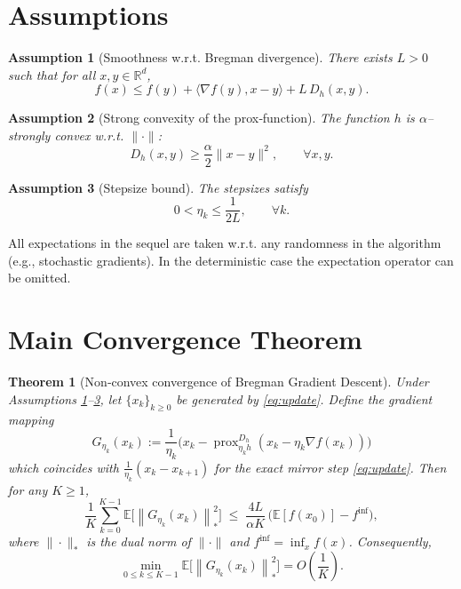 \documentclass{article}
\newtheorem{theorem}{Theorem}
\newtheorem{assumption}{Assumption}
\newcommand{\E}{\mathbb{E}}
\newcommand{\norm}[1]{\left\|#1\right\|}
\newcommand{\ip}[2]{\langle #1,#2\rangle}
\newcommand{\grad}{\nabla}
\newcommand{\D}{D_{h}}
\newcommand{\R}{\mathbb{R}}
\begin{document}
\section*{Assumptions}
\begin{assumption}[Smoothness w.r.t. Bregman divergence]\label{as:smooth}
There exists $L>0$ such that for all $x,y\in\R^{d}$,
\[
f(x)\le f(y)+\ip{\grad f(y)}{x-y}+L\,\D(x,y).
\]
\end{assumption}
\begin{assumption}[Strong convexity of the prox‑function]\label{as:hstrong}
The function $h$ is $\alpha$–strongly convex w.r.t. $\|\cdot\|$:
\[
\D(x,y)\ge \frac{\alpha}{2}\|x-y\|^{2},\qquad\forall x,y.
\]
\end{assumption}
\begin{assumption}[Stepsize bound]\label{as:stepsize}
The stepsizes satisfy 
\[
0<\eta_k\le \frac{1}{2L},\qquad\forall k .
\]
\end{assumption}
All expectations in the sequel are taken w.r.t. any randomness in the algorithm (e.g., stochastic gradients). In the deterministic case the expectation operator can be omitted.

\section*{Main Convergence Theorem}
\begin{theorem}[Non‑convex convergence of Bregman Gradient Descent]\label{thm:main}
Under Assumptions \ref{as:smooth}–\ref{as:stepsize}, let $\{x_k\}_{k\ge0}$ be generated by \eqref{eq:update}. Define the \emph{gradient mapping}
\[
G_{\eta_k}(x_k):=\frac{1}{\eta_k}\bigl(x_k-\operatorname{prox}_{\eta_k h}^{\D}(x_k-\eta_k\grad f(x_k))\bigr)
\]
which coincides with $\frac{1}{\eta_k}(x_k-x_{k+1})$ for the exact mirror step \eqref{eq:update}. Then for any $K\ge1$,
\begin{equation}
\label{eq:averaged-bound}
\frac{1}{K}\sum_{k=0}^{K-1}\E\!\bigl[\norm{G_{\eta_k}(x_k)}_{*}^{2}\bigr]
\;\le\;
\frac{4L}{\alpha K}\,\bigl(\E[f(x_0)]-f^{\inf}\bigr),
\end{equation}
where $\|\cdot\|_{*}$ is the dual norm of $\|\cdot\|$ and $f^{\inf}=\inf_{x}f(x)$. Consequently,
\[
\min_{0\le k\le K-1}\E\!\bigl[\norm{G_{\eta_k}(x_k)}_{*}^{2}\bigr]
=O\!\left(\frac{1}{K}\right).
\]
\end{theorem}
\end{document}
